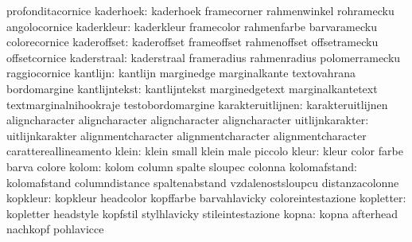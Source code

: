                            profonditacornice
                kaderhoek: kaderhoek                 framecorner
                           rahmenwinkel              rohramecku
                           angolocornice
               kaderkleur: kaderkleur                framecolor
                           rahmenfarbe               barvaramecku
                           colorecornice
              kaderoffset: kaderoffset               frameoffset
                           rahmenoffset              offsetramecku
                           offsetcornice
              kaderstraal: kaderstraal               frameradius
                           rahmenradius              polomerramecku
                           raggiocornice
                 kantlijn: kantlijn                  marginedge
                           marginalkante             textovahrana
                           bordomargine
            kantlijntekst: kantlijntekst             marginedgetext
                           marginalkantetext         textmarginalnihookraje
                           testobordomargine
        karakteruitlijnen: karakteruitlijnen         aligncharacter
                           aligncharacter            aligncharacter
                           aligncharacter            %
          uitlijnkarakter: uitlijnkarakter           alignmentcharacter
                           alignmentcharacter        alignmentcharacter
                           carattereallineamento     %
                    klein: klein                     small
                           klein                     male
                           piccolo
                    kleur: kleur                     color
                           farbe                     barva
                           colore
                    kolom: kolom                     column
                           spalte                    sloupec
                           colonna
             kolomafstand: kolomafstand              columndistance
                           spaltenabstand            vzdalenostsloupcu
                           distanzacolonne
                 kopkleur: kopkleur                  headcolor
                           kopffarbe                 barvahlavicky
                           coloreintestazione
                kopletter: kopletter                 headstyle
                           kopfstil                  stylhlavicky
                           stileintestazione
                    kopna: kopna                     afterhead
                           nachkopf                  pohlavicce

